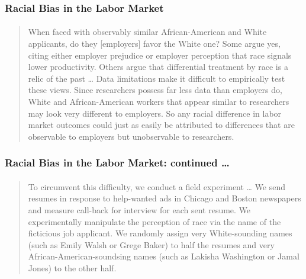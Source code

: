\begin{frame}
  \frametitle{Racial Bias in the Labor Market}
  \framesubtitle{ \href{https://www.jstor.org/stable/3592802}{}}

  \footnotesize
  \begin{quote}
    When faced with observably similar African-American and White applicants, do they [employers] favor the White one? Some argue yes, citing either employer prejudice or employer perception that race signals lower productivity. Others argue that differential treatment by race is a relic of the past \dots 
    Data limitations make it difficult to empirically test these views. 
    \alert{Since researchers possess far less data than employers do, White and African-American workers that appear similar to researchers may look very different to employers.} 
    So any racial difference in labor market outcomes could just as easily be attributed to differences that are observable to employers but unobservable to researchers.
  \end{quote}

\end{frame}
\begin{frame}
  \frametitle{Racial Bias in the Labor Market: continued \dots}
  \framesubtitle{ \href{https://www.jstor.org/stable/3592802}{}}

  \footnotesize
  \begin{quote}
    To circumvent this difficulty, we conduct a field experiment \dots
  We send resumes in response to help-wanted ads in Chicago and Boston newspapers and measure call-back for interview for each sent resume. 
  \alert{We experimentally manipulate the perception of race via the name of the ficticious job applicant.}
    We randomly assign very White-sounding names (such as Emily Walsh or Grege Baker) to half the resumes and very African-American-soundsing names (such as Lakisha Washington or Jamal Jones) to the other half.
  \end{quote}


\end{frame}

